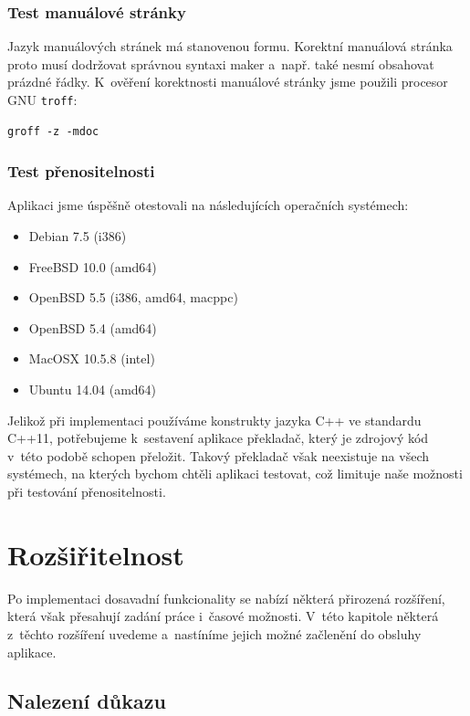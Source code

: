 \documentclass[thesis=B,czech,hidelinks]{thesis}[2012/06/26]
\begin{document}
\subsection{Test manuálové stránky}

Jazyk manuálových stránek má stanovenou formu. Korektní manuálová stránka proto musí dodržovat správnou syntaxi maker a~např. také nesmí obsahovat prázdné řádky. K~ověření korektnosti manuálové stránky jsme použili procesor GNU \texttt{troff}:

\begin{lstlisting}
groff -z -mdoc
\end{lstlisting}

\subsection{Test přenositelnosti}

Aplikaci jsme úspěšně otestovali na následujících operačních systémech:

\begin{itemize}
	\item Debian 7.5 (i386)
	\item FreeBSD 10.0 (amd64)
	\item OpenBSD 5.5 (i386, amd64, macppc)
	\item OpenBSD 5.4 (amd64)
	\item MacOSX 10.5.8 (intel)
	\item Ubuntu 14.04 (amd64)
\end{itemize}

Jelikož při implementaci používáme konstrukty jazyka C++ ve standardu C++11, potřebujeme k~sestavení aplikace překladač, který je zdrojový kód v~této podobě schopen přeložit. Takový překladač však neexistuje na všech systémech, na kterých bychom chtěli aplikaci testovat, což limituje naše možnosti při testování přenositelnosti.

%
%
%

\chapter{Rozšiřitelnost}

Po implementaci dosavadní funkcionality se nabízí některá přirozená rozšíření, která však přesahují zadání práce i~časové možnosti. V~této kapitole některá z~těchto rozšíření uvedeme a~nastíníme jejich možné začlenění do obsluhy aplikace.

\section{Nalezení důkazu}
\end{document}
